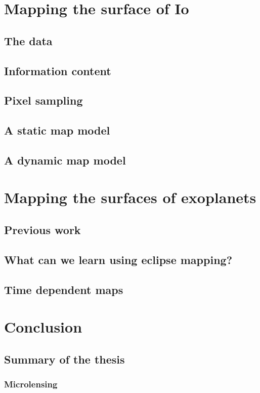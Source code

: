 \documentclass[]{report}
\begin{document}
\chapter{Mapping the surface of Io}
\section{The data}
\section{Information content}
\section{Pixel sampling}
\section{A static map model}
\section{A dynamic map model}

\chapter{Mapping the surfaces of exoplanets}
\section{Previous work}
\section{What can we learn using eclipse mapping?}
\section{Time dependent maps}

\chapter{Conclusion}
\section{Summary of the thesis}
\subsection{Microlensing}
\end{document}
